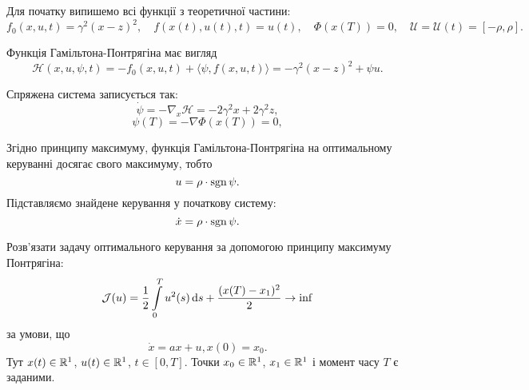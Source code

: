 \begin{solution}
    Для початку випишемо всі функції з теоретичної частини:
    \begin{equation}
        f_0(x, u, t) = \gamma^2 (x - z)^2, \quad f(x(t), u(t), t) = u(t), \quad \Phi(x(T)) = 0, \quad \mathcal{U} = \mathcal{U}(t) = [-\rho, \rho].
    \end{equation}
    
    Функція Гамільтона-Понтрягіна має вигляд
    \begin{equation}
        \mathcal{H} (x, u, \psi, t) = - f_0(x, u, t) + \langle \psi, f(x, u, t) \rangle = - \gamma^2 (x - z)^2 + \psi u.
    \end{equation}
    
    Спряжена система записується так:
    \begin{equation}
        \dot \psi = - \nabla_x \mathcal{H} = - 2 \gamma^2 x + 2 \gamma^2 z,
    \end{equation}
    \begin{equation} 
        \psi(T) = - \nabla \Phi(x(T)) = 0,
    \end{equation}
    
    Згідно принципу максимуму, функція Гамільтона-Понтрягіна на оптимальному керуванні досягає свого максимуму, тобто
    \begin{equation} 
        u = \rho \cdot \operatorname{sgn} \psi.
    \end{equation} 
    Підставляємо знайдене керування у початкову систему:
    \begin{equation}
        \dot x = \rho \cdot \operatorname{sgn} \psi.
    \end{equation}
\end{solution}

\begin{problem}
    Розв'язати задачу оптимального керування за допомогою принципу максимуму Понтрягіна:
    \begin{equation*}
        \mathcal{J}(u) = \dfrac12 \displaystyle\int\limits_0^T u^2(s) \, \mathrm{d} s + \dfrac{(x(T) - x_1)^2}{2} \to \inf
    \end{equation*}
    за умови, що
    \begin{equation*}
        \dot x = a x + u, x(0) = x_0.
    \end{equation*}
    Тут $x(t) \in \mathbb{R}^1$, $u(t) \in \mathbb{R}^1$, $t \in [0, T]$. Точки $x_0 \in \mathbb{R}^1$, $x_1 \in \mathbb{R}^1$ і момент часу $T$ є заданими.
\end{problem}

